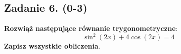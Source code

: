 \subsection*{Zadanie 6. (0-3)}
\textbf{Rozwiąż następujące równanie trygonometryczne}:
$$
 \sin^2(2x) + 4\cos(2x) =4 
$$
\textbf{Zapisz wszystkie obliczenia}.